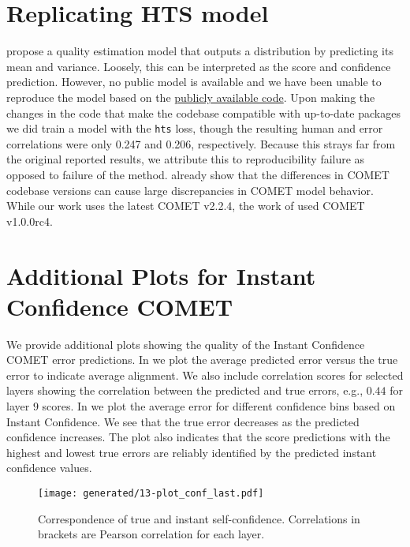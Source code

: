 \section{Replicating HTS model}
\label{sec:fail_hts}
\citet{zerva-etal-2022-disentangling} propose a quality estimation model that outputs a distribution by predicting its mean and variance.
Loosely, this can be interpreted as the score and confidence prediction.
However, no public model is available and we have been unable to reproduce the model based on the \href{https://github.com/deep-spin/uncertainties_MT_eval}{publicly available code}.
Upon making the changes in the code that make the codebase compatible with up-to-date packages we did train a model with the \texttt{hts} loss, though the resulting human and error correlations were only 0.247 and 0.206, respectively.
Because this strays far from the original reported results, we attribute this to reproducibility failure as opposed to failure of the method.
\citet{zouhar-etal-2024-pitfalls} already show that the differences in COMET codebase versions can cause large discrepancies in COMET model behavior.
While our work uses the latest COMET v2.2.4, the work of \citet{zerva-etal-2022-disentangling} used COMET v1.0.0rc4.


\section{Additional Plots for Instant Confidence COMET}
\label{app:confidence_add_plots}

We provide additional plots showing the quality of the Instant Confidence COMET error predictions. In  we plot the average predicted error versus the true error to indicate average alignment. We also include correlation scores for selected layers showing the correlation between the predicted and true errors, e.g., $0.44$ for layer $9$ scores.
In  we plot the average error for different confidence bins based on Instant Confidence. We see that the true error decreases as the predicted confidence increases. The plot also indicates that the score predictions with the highest and lowest true errors are reliably identified by the predicted instant confidence values.

\begin{figure}[h]
    \centering
    \texttt{[image: generated/13-plot\_conf\_last.pdf]}
    \caption{Correspondence of true and instant self-confidence. Correlations in brackets are Pearson correlation for each layer.}
    \label{fig:13-plot_conf}
\end{figure}


